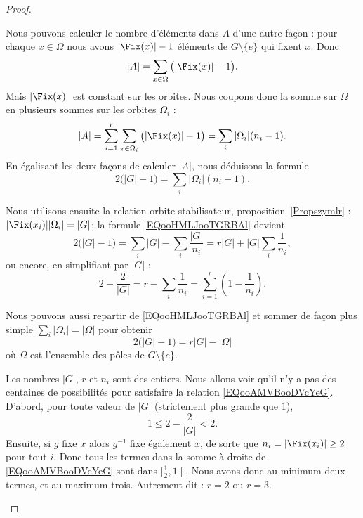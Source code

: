 \begin{proof}
\begin{subproof}
		Nous pouvons calculer le nombre d'éléments dans \( A \) d'une autre façon : pour chaque \( x\in \Omega\) nous avons \( | \Fix(x) |-1\) éléments de \( G\setminus\{ e \}\) qui fixent \( x\). Donc
		\begin{equation}
			| A |=\sum_{x\in\Omega}\big( | \Fix(x) |-1 \big).
		\end{equation}
		Mais \( | \Fix(x) |\) est constant sur les orbites. Nous coupons donc la somme sur \( \Omega\) en plusieurs sommes sur les orbites \( \Omega_i\) :
		\begin{equation}
			| A |=\sum_{i=1}^r\sum_{x\in \Omega_i}\big( | \Fix(x) |-1 \big)=\sum_i| \Omega_i |(n_i-1).
		\end{equation}
		En égalisant les deux façons de calculer \( | A |\), nous déduisons la formule
		\begin{equation}        \label{EQooHMLJooTGRBAl}
			2\big( | G |-1 \big)=\sum_i| \Omega_i |(n_i-1).
		\end{equation}

		Nous utilisons ensuite la relation orbite-stabilisateur, proposition~\ref{Propszymlr} : \( | \Fix(x_i) | |\Omega_i |=| G |\); la formule \eqref{EQooHMLJooTGRBAl} devient
		\begin{equation}
			2\big( | G |-1 \big)=\sum_i| G |-\sum_i\frac{ | G | }{ n_i }=r| G |+| G |\sum_i\frac{1}{ n_i },
		\end{equation}
		ou encore, en simplifiant par \( | G |\) :
		\begin{equation}        \label{EQooAMVBooDVcYeG}
			2-\frac{ 2 }{ | G | }=r-\sum_i\frac{1}{ n_i }=\sum_{i=1}^r\left( 1-\frac{1}{ n_i } \right).
		\end{equation}

		Nous pouvons aussi repartir de \eqref{EQooHMLJooTGRBAl} et sommer de façon plus simple \( \sum_i| \Omega_i |=| \Omega |\) pour obtenir
		\begin{equation}        \label{EQooTHUIooUEXsNl}
			2\big( | G |-1 \big)=r| G |-| \Omega |
		\end{equation}
		où \( \Omega\) est l'ensemble des pôles de \( G\setminus\{ e \}\).

		Les nombres \( | G |\), \( r\) et \( n_i\) sont des entiers. Nous allons voir qu'il n'y a pas des centaines de possibilités pour satisfaire la relation \eqref{EQooAMVBooDVcYeG}. D'abord, pour toute valeur de \( | G |\) (strictement plus grande que \( 1\)),
		\begin{equation}
			1\leq 2-\frac{ 2 }{ | G | }<2.
		\end{equation}
		Ensuite, si \( g\) fixe \( x\) alors \( g^{-1}\) fixe également \( x\), de sorte que \( n_i=| \Fix(x_i) |\geq 2\) pour tout \( i\). Donc tous les termes dans la somme à droite de \eqref{EQooAMVBooDVcYeG} sont dans \( \mathopen[ \frac{ 1 }{2} , 1 \mathclose[\). Nous avons donc au minimum deux termes, et au maximum trois. Autrement dit : \( r=2\) ou \( r=3\).


\end{subproof}
\end{proof}
